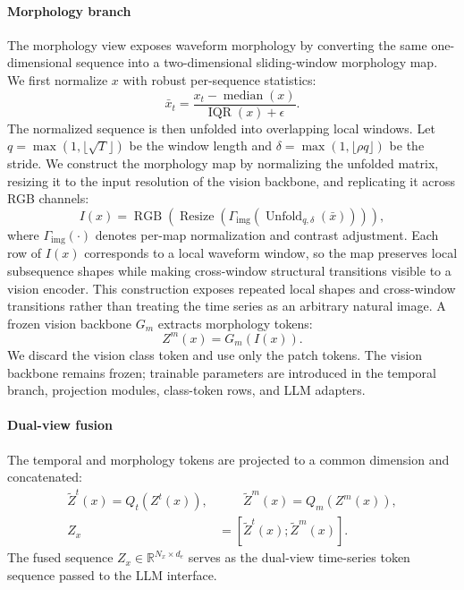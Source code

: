 \documentclass[10pt,journal,compsoc]{IEEEtran}
\begin{document}
\paragraph{Morphology branch}
The morphology view exposes waveform morphology by converting the same one-dimensional sequence into a two-dimensional sliding-window morphology map.
We first normalize $x$ with robust per-sequence statistics:
\begin{equation}
\label{eq:robust-normalization}
\bar{x}_t
=
\frac{x_t-\operatorname{median}(x)}
{\operatorname{IQR}(x)+\epsilon}.
\end{equation}
The normalized sequence is then unfolded into overlapping local windows.
Let $q=\max(1,\lfloor\sqrt{T}\rfloor)$ be the window length and
$\delta=\max(1,\lfloor\rho q\rfloor)$ be the stride.
We construct the morphology map by normalizing the unfolded matrix, resizing it to the input resolution of the vision backbone, and replicating it across RGB channels:
\begin{equation}
\label{eq:morphology-map}
I(x)
=
\operatorname{RGB}
\left(
\operatorname{Resize}
\left(
\Gamma_{\mathrm{img}}
\left(
\operatorname{Unfold}_{q,\delta}(\bar{x})
\right)
\right)
\right),
\end{equation}
where $\Gamma_{\mathrm{img}}(\cdot)$ denotes per-map normalization and contrast adjustment.
Each row of $I(x)$ corresponds to a local waveform window, so the map preserves local subsequence shapes while making cross-window structural transitions visible to a vision encoder.
This construction exposes repeated local shapes and cross-window transitions rather than treating the time series as an arbitrary natural image.
A frozen vision backbone $G_m$ extracts morphology tokens:
\begin{equation}
\label{eq:morphology-encoder}
Z^{m}(x)=G_m(I(x)).
\end{equation}
We discard the vision class token and use only the patch tokens.
The vision backbone remains frozen; trainable parameters are introduced in the temporal branch, projection modules, class-token rows, and LLM adapters.

\paragraph{Dual-view fusion}
The temporal and morphology tokens are projected to a common dimension and concatenated:
\begin{equation}
\label{eq:dual-view-fusion}
\begin{aligned}
\tilde{Z}^{t}(x)=Q_t(Z^{t}(x)),
&\qquad
\tilde{Z}^{m}(x)=Q_m(Z^{m}(x)),
\\
Z_x&=
\left[
\tilde{Z}^{t}(x);
\tilde{Z}^{m}(x)
\right].
\end{aligned}
\end{equation}
The fused sequence $Z_x\in\mathbb{R}^{N_x\times d_e}$ serves as the dual-view time-series token sequence passed to the LLM interface.
\end{document}
